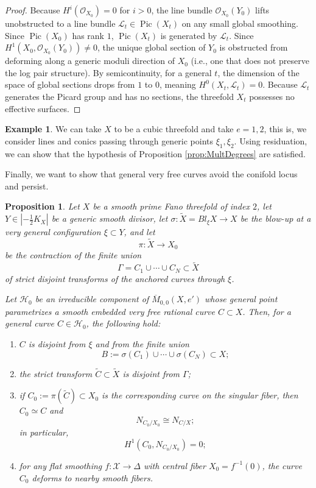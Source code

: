 \documentclass[11pt]{article}
\newtheorem{prop}[thm]{Proposition}
\theoremstyle{definition}
\newtheorem{ex}[thm]{Example}
\newcommand{\OO}{\mathcal{O}}
\DeclareMathOperator{\Pic}{Pic}
\begin{document}
\begin{proof}
\vspace{0.5em}
Because $H^i(\OO_{X_0}) = 0$ for $i > 0$, the line bundle $\OO_{X_0}(Y_0)$ lifts unobstructed to a line bundle $\mathcal{L}_t \in \Pic(X_t)$ on any small global smoothing. Since $\Pic(X_0)$ has rank $1$, $\Pic(X_t)$ is generated by $\mathcal{L}_t$.
 Since $H^1(X_0, \OO_{X_0}(Y_0)) \neq 0$, the unique global section of $Y_0$ is obstructed from deforming along a generic moduli direction of $X_0$ (i.e., one that does not preserve the log pair structure). By semicontinuity, for a general $t$, the dimension of the space of global sections drops from $1$ to $0$, meaning $H^0(X_t, \mathcal{L}_t) = 0$. Because $\mathcal{L}_t$ generates the Picard group and has no sections, the threefold $X_t$ possesses no effective surfaces.
\end{proof}

\begin{ex}
  We can take $X$ to be a cubic threefold and take $e=1,2$, this is, we consider lines and conics passing through generic points $\xi_1,\xi_2$. Using residuation, we can show that the hypothesis of Proposition \ref{prop:MultDegrees} are satisfied.
\end{ex}
Finally, we want to show that general very free curves avoid the conifold locus and persist.
\begin{prop}
\label{prop:avoidance_persistence}
Let $X$ be a smooth prime Fano threefold of index $2$, let $Y \in |-\frac{1}{2}K_X|$ be a generic smooth divisor, let
$\sigma:\tilde X=Bl_{\xi}X\to X$ be the blow-up at a very general configuration
$\xi\subset Y$, and let
\[
\pi:\tilde X\to X_0
\]
be the contraction of the finite union
\[
\Gamma=C_1\cup\cdots\cup C_N\subset \tilde X
\]
of strict disjoint transforms of the anchored curves through $\xi$.

Let $\mathcal H_0$ be an irreducible component of $\overline M_{0,0}(X,e')$
whose general point parametrizes a smooth embedded very free rational curve
$C\subset X$. Then, for a general curve $C\in \mathcal H_0$, the following hold:
\begin{enumerate}
\item $C$ is disjoint from $\xi$ and from the finite union
\[
B:=\sigma(C_1)\cup\cdots\cup\sigma(C_N)\subset X;
\]
\item the strict transform $\tilde C\subset \tilde X$ is disjoint from $\Gamma$;
\item if $C_0:=\pi(\tilde C)\subset X_0$ is the corresponding curve on the singular
fiber, then $C_0\simeq C$ and
\[
N_{C_0/X_0}\cong N_{C/X};
\]
in particular,
\[
H^1(C_0,N_{C_0/X_0})=0;
\]
\item for any flat smoothing $f:\mathcal X \to \Delta$ with central fiber $X_0=f^{-1}(0)$, the curve $C_0$ deforms to nearby smooth fibers.
\end{enumerate}
\end{prop}
\end{document}
